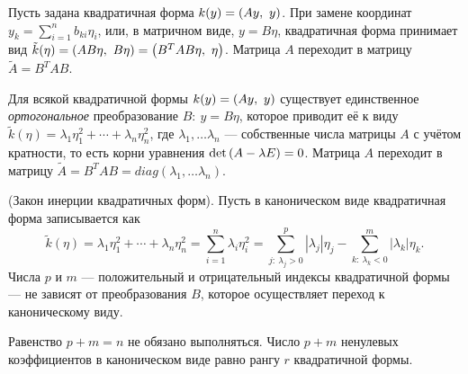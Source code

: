     \begin{prop}
        Пусть задана квадратичная форма $k(y) = \left({Ay,\ y}\right)$. При замене координат $y_k = \sum_{i=1}^n b_{ki}\eta_i$, или, в матричном виде,
        $y = B\eta$, квадратичная форма принимает вид $\tilde{k}(\eta) = \left({AB\eta,\ B\eta}\right) = \left({B^T AB\eta,\ \eta}\right)$. Матрица $A$ переходит
        в матрицу $\tilde{A} = B^T AB$.
    \end{prop}

    \begin{theorem}
        Для всякой квадратичной формы $k(y) = \left({Ay,\ y}\right)$ существует единственное \textit{ортогональное} преобразование $B: \: y = B\eta$, которое
        приводит её к виду $\tilde{k}(\eta) = \lambda_1 \eta_1^2 + \cdots + \lambda_n \eta_n^2$, где $\lambda_1,\ldots\lambda_n$ --- собственные числа
        матрицы $A$ с учётом кратности, то есть корни уравнения $\det \left({A - \lambda E}\right) = 0$. Матрица $A$ переходит в матрицу
        $\tilde{A} = B^T AB = diag(\lambda_1,\ldots\lambda_n)$.
    \end{theorem}


    \begin{theorem}
        (Закон инерции квадратичных форм). Пусть в каноническом виде квадратичная форма записывается как
        \begin{equation*}
            \tilde{k}(\eta) = \lambda_1 \eta_1^2 + \cdots + \lambda_n \eta_n^2 = \sum_{i = 1}^n\lambda_i \eta_i^2 = 
            \sum_{j:\: \lambda_j > 0}^p |\lambda_j| \eta_j - \sum_{k:\: \lambda_k < 0}^m |\lambda_k| \eta_k.
        \end{equation*}
        Числа $p$ и $m$ --- положительный и отрицательный индексы квадратичной формы --- не зависят от преобразования $B$, которое осуществляет
        переход к каноническому виду.
    \end{theorem}
    \begin{note}
        Равенство $p + m = n$ не обязано выполняться. Число $p + m$ ненулевых коэффициентов в каноническом виде равно рангу $r$ квадратичной формы.
    \end{note}
    
